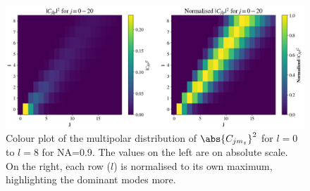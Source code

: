 \begin{figure}
    \centering
    \includegraphics[width=0.9\linewidth]{Figures/C_NA09.png}
    \caption{Colour plot of the multipolar distribution of $\abs{C_{jm_z}}^2$ for $l=0$ to $l=8$ for NA=0.9. The values on the left are on absolute scale. On the right, each row ($l$) is normalised to its own maximum, highlighting the dominant modes more.}
    \label{fig:Cj_NA09}
\end{figure}